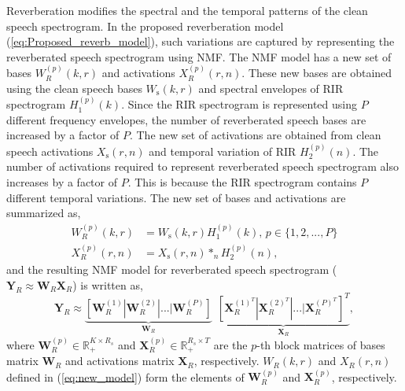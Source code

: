 Reverberation modifies the spectral and the temporal patterns of the clean speech spectrogram. In the proposed reverberation model (\ref{eq:Proposed_reverb_model}), such variations are captured by representing the reverberated speech spectrogram using NMF. The NMF model has a new set of bases $W_R^{(p)}(k,r)$ and activations $X_R^{(p)}(r,n)$. These new bases are obtained using the clean speech bases $W_{\text{s}}(k,r)$ and spectral envelopes of RIR spectrogram $H_1^{(p)}(k)$. Since the RIR spectrogram is represented using $P$ different frequency envelopes, the number of reverberated speech bases are increased by a factor of $P$. The new set of activations are obtained from clean speech activations $X_{\text{s}}(r,n)$ and temporal variation of RIR $H_2^{(p)}(n)$. The number of activations required to represent reverberated speech spectrogram also increases by a factor of $P$. This is because the RIR spectrogram contains $P$ different temporal variations. The new set of bases and activations are summarized as,
\begin{align}
W_R^{(p)}(k,r) &= W_{\text{s}}(k,r)H_1^{(p)}(k)\text{,   }p \in \{1,2,...,P\}\nonumber\\
X_R^{(p)}(r,n) &= X_{\text{s}}(r,n)*_n H_2^{(p)}(n),
\label{eq:new_model}
\end{align}
and the resulting NMF model for reverberated speech spectrogram ($\mathbf{Y}_R \approx \mathbf{W}_R\mathbf{X}_R$) is written as,
\begin{equation}
\mathbf{Y}_R \approx \underbrace{[\mathbf{W}_R^{(1)} | \mathbf{W}_R^{(2)}|...|\mathbf{W}_R^{(P)}]}_\textrm{$\mathbf{W}_R$}\ \ \underbrace{[\mathbf{X}_R^{(1)^T}|\mathbf{X}_R^{(2)^T}|...|\mathbf{X}_R^{(P)^T}]^T}_\textrm{$\mathbf{X}_R$},
\label{eq:NMF_reverb_model}
\end{equation}
where $\mathbf{W}_R^{(p)} \in \mathbb{R}_+^{K \times R_s}$ and $\mathbf{X}_R^{(p)}\in \mathbb{R}_+^{R_s \times T}$ are the $p$-th block matrices of bases matrix $\mathbf{W}_R$ and activations matrix $\mathbf{X}_R$, respectively. $W_R(k,r)$ and $X_R(r,n)$ defined in (\ref{eq:new_model}) form the elements of $\mathbf{W}_R^{(p)}$ and $\mathbf{X}_R^{(p)}$, respectively. 

